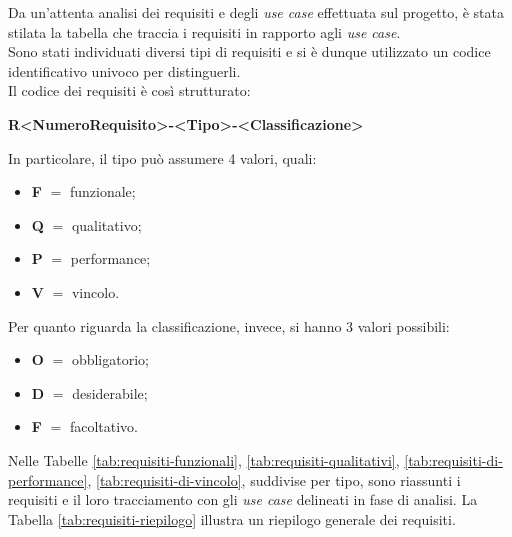 \noindent Da un'attenta analisi dei requisiti e degli \textit{use case} effettuata sul progetto, è stata stilata la tabella che traccia i requisiti in rapporto agli \textit{use case}.\\
Sono stati individuati diversi tipi di requisiti e si è dunque utilizzato un codice identificativo univoco per distinguerli.\\
Il codice dei requisiti è così strutturato:
\begin{center}
    \textbf{R<NumeroRequisito>-<Tipo>-<Classificazione>}
\end{center}
In particolare, il tipo può assumere 4 valori, quali:
\begin{itemize}
    \item \textbf{F} $=$ funzionale;
    \item \textbf{Q} $=$ qualitativo;
    \item \textbf{P} $=$ performance;
    \item \textbf{V} $=$ vincolo.
\end{itemize}
Per quanto riguarda la classificazione, invece, si hanno 3 valori possibili:
\begin{itemize}
    \item \textbf{O} $=$ obbligatorio;
    \item \textbf{D} $=$ desiderabile;
    \item \textbf{F} $=$ facoltativo.
\end{itemize}
Nelle Tabelle \ref{tab:requisiti-funzionali}, \ref{tab:requisiti-qualitativi}, \ref{tab:requisiti-di-performance}, \ref{tab:requisiti-di-vincolo}, suddivise per tipo, sono riassunti i requisiti e il loro tracciamento con gli \textit{use case} delineati in fase di analisi.
La Tabella \ref{tab:requisiti-riepilogo} illustra un riepilogo generale dei requisiti.
\renewcommand{\arraystretch}{1.6}


